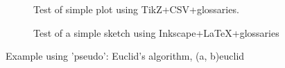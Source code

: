 \documentclass[a4paper]{article}  %
\begin{document}
    \begin{figure}[htbp]
        \centering
        \caption{Test of simple plot using TikZ+CSV+glossaries.}
		\label{fig:test}
	\end{figure}
    
	
	\begin{figure}[htbp]
		\centering
    	\caption{Test of a simple sketch using Inkscape+\LaTeX+glossaries}
		\label{ch1:fig:D1Q5}
	\end{figure}

    \begin{table}[htbp]
        \caption{Test of table tabularray+CSV+glossaries+SIunitX.}
		\label{tab:test}
	\end{table}

    \begin{table}[htbp]
        \caption{Test of table standalone manual tabularray.}
		\label{tab:test_manual}
	\end{table}
    
	\begin{algorithm}{Example using 'pseudo': Euclid's algorithm, (a, b)}{euclid}
    \end{algorithm}
\end{document}
